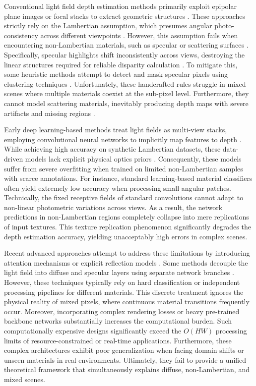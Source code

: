 Conventional light field depth estimation methods primarily exploit epipolar plane images or focal stacks to extract geometric structures \cite{EPIfocalstacks}. These approaches strictly rely on the Lambertian assumption, which presumes angular photo-consistency across different viewpoints \cite{Lambertianassumption}. However, this assumption fails when encountering non-Lambertian materials, such as specular or scattering surfaces \cite{nonLambertianmaterials}. Specifically, specular highlights shift inconsistently across views, destroying the linear structures required for reliable disparity calculation \cite{specularhighlights}. To mitigate this, some heuristic methods attempt to detect and mask specular pixels using clustering techniques \cite{heuristicmasking}. Unfortunately, these handcrafted rules struggle in mixed scenes where multiple materials coexist at the sub-pixel level. Furthermore, they cannot model scattering materials, inevitably producing depth maps with severe artifacts and missing regions \cite{scatteringmaterials}.

Early deep learning-based methods treat light fields as multi-view stacks, employing convolutional neural networks to implicitly map features to depth \cite{earlydeeplearningEPINet}. While achieving high accuracy on synthetic Lambertian datasets, these data-driven models lack explicit physical optics priors \cite{physicalopticspriors}. Consequently, these models suffer from severe overfitting when trained on limited non-Lambertian samples with scarce annotations. For instance, standard learning-based material classifiers often yield extremely low accuracy when processing small angular patches. Technically, the fixed receptive fields of standard convolutions cannot adapt to non-linear photometric variations across views. As a result, the network predictions in non-Lambertian regions completely collapse into mere replications of input textures. This texture replication phenomenon significantly degrades the depth estimation accuracy, yielding unacceptably high errors in complex scenes.

Recent advanced approaches attempt to address these limitations by introducing attention mechanisms or explicit reflection models \cite{attentionmechanismsreflectio}. Some methods decouple the light field into diffuse and specular layers using separate network branches \cite{decouplelightfield}. However, these techniques typically rely on hard classification or independent processing pipelines for different materials. This discrete treatment ignores the physical reality of mixed pixels, where continuous material transitions frequently occur. Moreover, incorporating complex rendering losses or heavy pre-trained backbone networks substantially increases the computational burden. Such computationally expensive designs significantly exceed the $O(HW)$ processing limits of resource-constrained or real-time applications. Furthermore, these complex architectures exhibit poor generalization when facing domain shifts or unseen materials in real environments. Ultimately, they fail to provide a unified theoretical framework that simultaneously explains diffuse, non-Lambertian, and mixed scenes.

